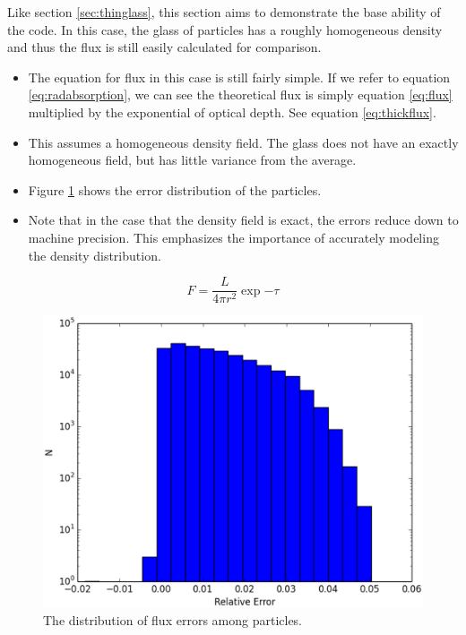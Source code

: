 Like section \ref{sec:thinglass}, this section aims to demonstrate the base ability of the code. In this case, the glass of particles has a roughly homogeneous density and thus the flux is still easily calculated for comparison.

\begin{itemize}
\item The equation for flux in this case is still fairly simple. If we refer to equation \ref{eq:radabsorption}, we can see the theoretical flux is simply equation \ref{eq:flux} multiplied by the exponential of optical depth. See equation \ref{eq:thickflux}.
\item This assumes a homogeneous density field. The glass does not have an exactly homogeneous field, but has little variance from the average.
\item Figure \ref{fig:thickglasserrors} shows the error distribution of the particles.
\item Note that in the case that the density field is exact, the errors reduce down to machine precision. This emphasizes the importance of accurately modeling the density distribution.
\end{itemize}

\begin{equation}
\label{eq:thickflux}
F = \frac{L}{4\pi r^2} \exp{-\tau}
\end{equation}

\begin{figure}
\includegraphics[width=\textwidth]{graphics/error.eps}
\caption[Error distribution for a single source in a uniform field.]{The distribution of flux errors among particles.}
\label{fig:thickglasserrors}
\end{figure}


